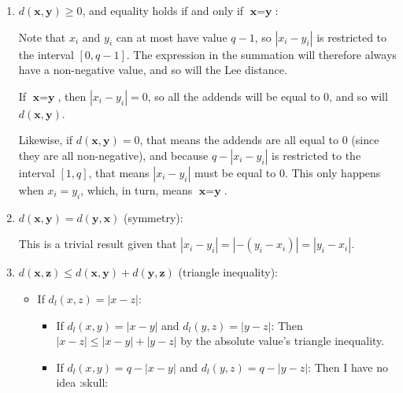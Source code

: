 \begin{enumerate}[label=\alph*)]
	\item $d(\textbf{x}, \textbf{y})\geq0$, and equality holds if and only if $\textbf{x} = \textbf{y}$:
	
	Note that $x_i$ and $y_i$ can at most have value $q-1$, so $|x_i - y_i|$ is restricted to the interval $[0, q-1]$. The expression in the summation will therefore always have a non-negative value, and so will the Lee distance.
	
	If $\textbf{x} = \textbf{y}$, then $|x_i - y_i| = 0$, so all the addends will be equal to $0$, and so will $d(\textbf{x}, \textbf{y})$.
	
	Likewise, if $d(\textbf{x}, \textbf{y}) = 0$, that means the addends are all equal to $0$ (since they are all non-negative), and because $q - |x_i - y_i|$ is restricted to the interval $[1, q]$, that means $|x_i - y_i|$ must be equal to $0$. This only happens when $x_i = y_i$, which, in turn, means $\textbf{x} = \textbf{y}$.
	
	\item $d(\textbf{x}, \textbf{y}) = d(\textbf{y}, \textbf{x})$ (symmetry):
	
	This is a trivial result given that $|x_i - y_i| = |-(y_i - x_i)| = |y_i - x_i|$.
	
	\item $d(\textbf{x}, \textbf{z}) \leq d(\textbf{x}, \textbf{y}) + d(\textbf{y}, \textbf{z})$ (triangle inequality):
	
	
	\begin{itemize}
		\item If $d_l(x, z) = |x - z|$:
		\begin{itemize}
			\item If $d_l(x, y) = |x - y|$ and $d_l(y, z) = |y - z|$: Then $|x - z| \leq |x - y| + |y - z|$ by the absolute value's triangle inequality.
			\item If $d_l(x, y) = q - |x - y|$ and $d_l(y, z) = q - |y - z|$: Then
			I have no idea :skull:
			
		\end{itemize}
	\end{itemize}
\end{enumerate}
